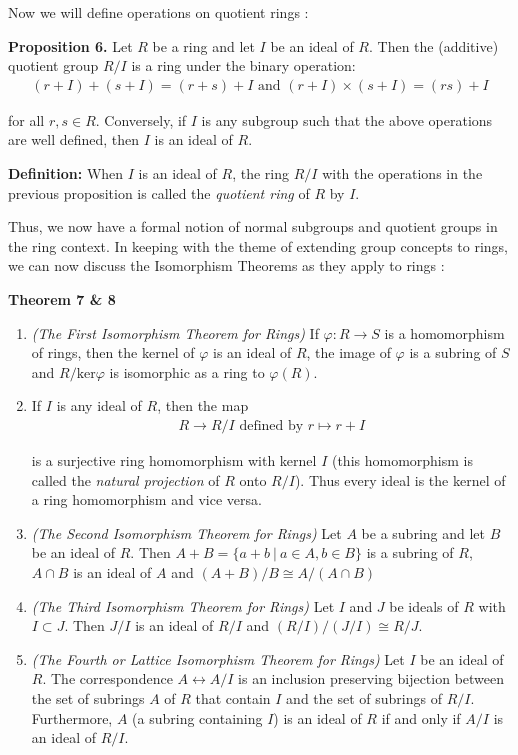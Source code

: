 \documentclass[11pt, reqno]{amsart}
\theoremstyle{plain}
\theoremstyle{definition}
\theoremstyle{example}
\begin{document}
Now we will define operations on quotient rings \cite[\S 7.3, p. 242-243]{dummit}:

\par
\textbf{Proposition 6.} Let $R$ be a ring and let $I$ be an ideal of $R$. Then the (additive) quotient group $R/I$ is a ring under the binary operation:
\begin{align*}
(r+I) + (s+I) = (r+s) + I \text{  and  } (r+I) \times (s+I) = (rs) + I
\end{align*}

for all $r, s \in R$. Conversely, if $I$ is any subgroup such that the above operations are well defined, then $I$ is an ideal of $R$.

\par
\textbf{Definition:} When $I$ is an ideal of $R$, the ring $R/I$ with the operations in the previous proposition is called the \textit{quotient ring} of $R$ by $I$.

\par
Thus, we now have a formal notion of normal subgroups and quotient groups in the ring context. In keeping with the theme of extending group concepts to rings, we can now discuss the Isomorphism Theorems as they apply to rings \cite[\S 7.3, p. 243, 246]{dummit}:

\textbf{Theorem 7 \& 8}
\begin{enumerate}
\item \textit{(The First Isomorphism Theorem for Rings)} If $\varphi: R \to S$ is a homomorphism of rings, then the kernel of $\varphi$ is an ideal of $R$, the image of $\varphi$ is a subring of $S$ and $R/\text{ker}\varphi$ is isomorphic as a ring to $\varphi(R)$.
\item If $I$ is any ideal of $R$, then the map
\begin{align*}
R \to R/I \text{   defined by   } r \mapsto r + I
\end{align*}

is a surjective ring homomorphism with kernel $I$ (this homomorphism is called the \textit{natural projection} of $R$ onto $R/I$). Thus every ideal is the kernel of a ring homomorphism and vice versa.

\item \textit{(The Second Isomorphism Theorem for Rings)} Let $A$ be a subring and let $B$ be an ideal of $R$. Then $A + B = \{a+b \ | \ a \in A, b \in B\}$ is a subring of $R$, $A \cap B$ is an ideal of $A$ and $(A+B)/B \cong A/(A \cap B)$

\item \textit{(The Third Isomorphism Theorem for Rings)} Let $I$ and $J$ be ideals of $R$ with $I \subset J$. Then $J/I$ is an ideal of $R/I$ and $(R/I)/(J/I) \cong R/J$.

\item \textit{(The Fourth or Lattice Isomorphism Theorem for Rings)} Let $I$ be an ideal of $R$. The correspondence $A \leftrightarrow A/I$ is an inclusion preserving bijection between the set of subrings $A$ of $R$ that contain $I$ and the set of subrings of $R/I$. Furthermore, $A$ (a subring containing $I$) is an ideal of $R$ if and only if $A/I$ is an ideal of $R/I$.
\end{enumerate}
\end{document}
